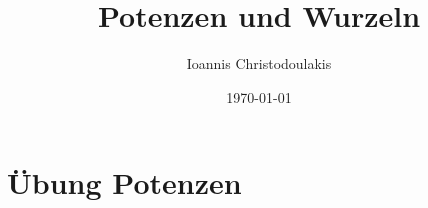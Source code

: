 \documentclass[11pt, a4paper, twoside, fleqn]{article}
\title{Potenzen und Wurzeln}
\author{Ioannis Christodoulakis}
\date{\today}
\begin{document}
\maketitle
\newpage
\newpage
\section{Übung Potenzen}
\end{document}
